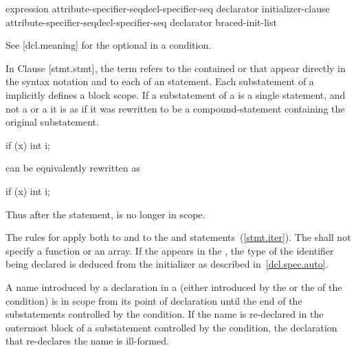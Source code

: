 \documentclass[ebook,10pt,oneside,openany,final]{memoir}
\begin{document}
\begin{bnf}
\br
    expression\br
    attribute-specifier-seq\opt decl-specifier-seq declarator \terminal{=} initializer-clause\br
    attribute-specifier-seq\opt decl-specifier-seq declarator braced-init-list
\end{bnf}

See [dcl.meaning] for the optional  in a condition.

\begin{shaded}

In Clause [stmt.stmt], the term  refers to the contained  or  that appear
directly in the  syntax notation and to each  of an  statement.
Each substatement of a  implicitly defines a block scope. If a substatement of a
 is a single statement, and not a
 or a  it is as if it was rewritten to be a
compound-statement containing the original substatement.

\end{shaded}

\enterexample

\begin{codeblock}
if (x)
  int i;
\end{codeblock}

can be equivalently rewritten as

\begin{codeblock}
if (x) {
  int i;
}
\end{codeblock}

Thus after the  statement,  is no longer in scope.
\exitexample

\pnum
{}%
The rules for  apply both to
 and to the  and 
statements~(\ref{stmt.iter}). The  shall not
specify a function or an array. If the   appears in
the ,
the type of the identifier being declared is deduced from the initializer as described in~\ref{dcl.spec.auto}.

\pnum
{}%
%
A name introduced by a declaration in a  (either
introduced by the  or the
 of the condition) is in scope from its point of
declaration until the end of the substatements controlled by the
condition. If the name is re-declared in the outermost block of a
substatement controlled by the condition, the declaration that
re-declares the name is ill-formed.
\enterexample
\end{document}
